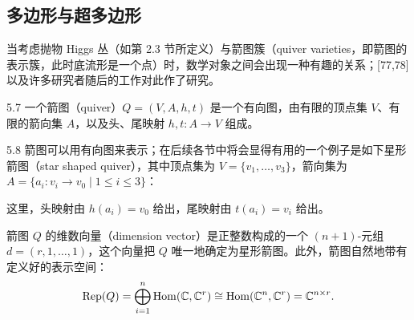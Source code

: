 \subsection{多边形与超多边形}

当考虑抛物 Higgs 丛（如第 2.3 节所定义）与箭图簇（quiver varieties，即箭图的表示簇，此时底流形是一个点）时，数学对象之间会出现一种有趣的关系；[77,78] 以及许多研究者随后的工作对此作了研究。

\begin{defn}{5.7}
一个箭图（quiver）$Q=(V,A,h,t)$ 是一个有向图，由有限的顶点集 $V$、有限的箭向集 $A$，以及头、尾映射 $h,t : A\to V$ 组成。
\end{defn}

\begin{exmp}{5.8}
箭图可以用有向图来表示；在后续各节中将会显得有用的一个例子是如下星形箭图（star shaped quiver），其中顶点集为 $V=\{v_1,\dots,v_3\}$，箭向集为 $A=\{a_i : v_i\to v_0\mid 1\leqslant i\leqslant 3\}$：
\begin{center}
\end{center}
这里，头映射由 $h(a_i)=v_0$ 给出，尾映射由 $t(a_i)=v_i$ 给出。
\end{exmp}


箭图 $Q$ 的维数向量（dimension vector）是正整数构成的一个 $(n+1)$-元组 $d=(r,1,\dots,1)$，这个向量把 $Q$ 唯一地确定为星形箭图。此外，箭图自然地带有定义好的表示空间：
\[
\operatorname{Rep}(Q)=\bigoplus_{i=1}^{n}\operatorname{Hom}(\mathbb{C},\mathbb{C}^r)\cong\operatorname{Hom}(\mathbb{C}^n,\mathbb{C}^r)=\mathbb{C}^{n\times r}.
\]


